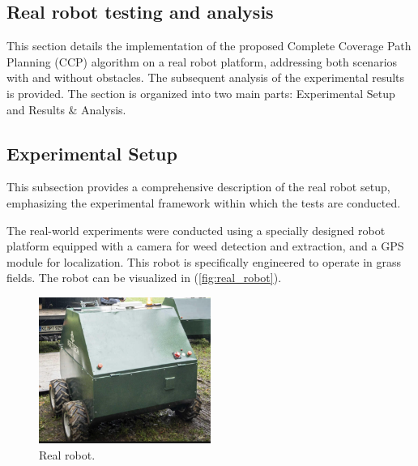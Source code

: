 
\subsection{Real robot testing and analysis} 

This section details the implementation of the proposed Complete Coverage Path Planning (CCP) algorithm on a real robot platform, addressing both scenarios with and without obstacles. The subsequent analysis of the experimental results is provided. The section is organized into two main parts: Experimental Setup and Results \& Analysis. 

\subsection{Experimental Setup} 

This subsection provides a comprehensive description of the real robot setup, emphasizing the experimental framework within which the tests are conducted.   

\vspace*{6mm}   


The real-world experiments were conducted using a specially designed robot platform equipped with a camera for weed detection and extraction, and a GPS module for localization. This robot is specifically engineered to operate in grass fields. The robot can be visualized in (\autoref{fig:real_robot}).   
\begin{figure}[htbp]
    \centering
    \includegraphics[width=0.5\textwidth]{Images/real_robot/robot.png}
    \caption{Real robot.}
    \label{fig:real_robot}
\end{figure}


\vspace*{6mm}   


